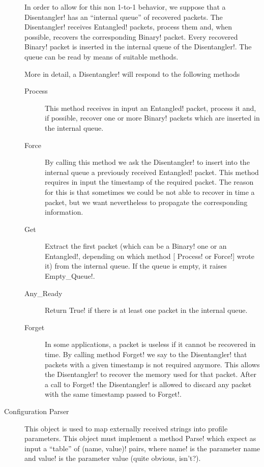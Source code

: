 \documentclass[a4paper]{medusabook}
\begin{document}
\begin{description}
  In order to allow for this non 1-to-1 behavior, we suppose that a
  \ttt Disentangler! has an ``internal queue'' of recovered packets.
  The \ttt Disentangler! receives \ttt Entangled! packets, process
  them and, when possible, recovers the corresponding \ttt Binary!
  packet.  Every recovered \ttt Binary! packet is inserted in the
  internal queue of the \ttt Disentangler!.  The queue can be read by
  means of suitable methods.  

  More in detail, a \ttt Disentangler! will respond to the following
  methods
  \begin{description}
    \item[Process] This method receives in input an \ttt Entangled!
    packet, process it and, if possible, recover one or more \ttt
    Binary! packets which are inserted in the internal queue.
    \item[Force] By calling this method we ask the \ttt Disentangler!
    to insert into the internal queue a previously received \ttt
    Entangled! packet. This method requires in input the timestamp of
    the required packet. The reason for this is that sometimes we
    could be not able to recover in time a packet, but we want
    nevertheless to propagate the corresponding information.  
    \item[Get] Extract the first packet (which can be a \ttt Binary!
    one or an \ttt Entangled!, depending on which method [\ttt
    Process! or \ttt Force!] wrote it) from the internal queue.  If the
    queue is empty, it raises \ttt Empty_Queue!.  
    \item[Any\_Ready] Return \ttt True! if there is at least one
    packet in the internal queue.
    \item[Forget] In some applications, a packet is useless if it
    cannot be recovered in time.  By calling method \ttt Forget! we
    say to the \ttt Disentangler! that packets with a given timestamp
    is not required anymore.  This allows the \ttt Disentangler! to
    recover the memory used for that packet.  After a call to \ttt
    Forget! the \ttt Disentangler! is allowed to discard any packet
    with the same timestamp passed to \ttt Forget!.
  \end{description}
  \item[Configuration Parser]  This object is used to map externally
  received strings into profile parameters.  This object must
  implement a method \ttt Parse! which expect as input a ``table'' of
  \ttt (name, value)! pairs, where \ttt name! is the parameter name
  and \ttt value! is the parameter value (quite obvious, isn't?).

\end{description}
\end{document}
